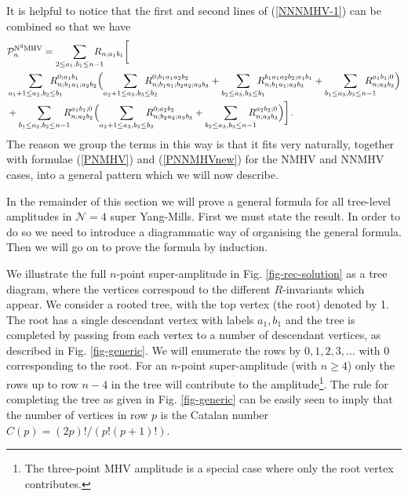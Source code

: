 \documentclass[12pt]{article}
\begin{document}
{It is helpful to notice that the first and second lines of (\ref{NNNMHV-1}) can be combined so that we have
\begin{align}\label{NNNMHV-2}
&\mathcal{P}^{\rm{N}^3\rm{MHV}}_n = \sum_{2\leq a_1,b_1 \leq n-1}
  \!\!\!\!\!\!\!R_{n;a_1b_1}\biggl[\notag \\
&\sum_{a_1+1 \leq a_2,b_2 \leq b_1} \!\!\!\!\!\!\!\!\!
    R_{n;b_1a_1;a_2b_2}^{0;a_1b_1} \Bigl(\sum_{a_2+1 \leq a_3,b_3 \leq b_2}
    \!\!\!\!\!\!\!\!\!R_{n;b_1a_1;b_2a_2;a_3b_3}^{0;b_1a_1a_2b_2} + \sum_{b_2 \leq
      a_3,b_3 \leq b_1} \!\!\!\!\!\!R_{n;b_1a_1;a_3b_3}^{b_1a_1a_2b_2;a_1b_1}+ \sum_{b_1
      \leq a_3,b_3 \leq n-1} \!\!\!\!\!\!\!\! R_{n;a_3b_3}^{a_1b_1;0}
    \Bigr)\notag \\
& +\sum_{b_1\leq a_2,b_2 \leq n-1} \!\!\!\!\!
    R_{n;a_2b_2}^{a_1b_1;0}\Bigl(\sum_{a_2+1\leq a_3,b_3 \leq b_2} \!\!\!\!\!\!
    R_{n;b_2a_2;a_3b_3}^{0;a_2b_2} + \sum_{b_2 \leq a_3,b_3 \leq n-1}
    \!\!\!\!\!\!R_{n;a_3b_3}^{a_2b_2;0}\Bigr)
\biggr] \,.
\end{align}
The reason we group the terms in this way is that it fits very naturally, together with formulae (\ref{PNMHV}) and (\ref{PNNMHVnew}) for the NMHV and NNMHV cases, into a general pattern which we will now describe.

In the remainder of this section we will prove a general formula for all tree-level amplitudes in $\mathcal{N}=4$ super Yang-Mills. First we must state the result. In order to do so we need to introduce a diagrammatic way of organising the general formula. Then we will go on to prove the formula by induction.

We illustrate the full
$n$-point super-amplitude in Fig. \ref{fig-rec-solution} as a tree diagram, where the vertices correspond to the different $R$-invariants which appear. We consider
a rooted tree, with the top vertex (the root) denoted by 1. The root
has a single descendant vertex with labels $a_1,b_1$ and
the tree is completed by passing from each vertex to a number of
descendant vertices, as described in Fig. \ref{fig-generic}. We will enumerate the rows by
$0,1,2,3,\ldots$ with 0
corresponding to the root.
For an
$n$-point super-amplitude (with $n\geq 4$) only the rows up to row $n-4$ in the
tree will contribute to the amplitude\footnote{The three-point MHV amplitude is a special case where
  only the root vertex contributes.}.
The rule for completing the tree as given
in Fig. \ref{fig-generic} can be easily seen to imply that the number
of vertices in row $p$ is the Catalan number $C(p) = (2p)! / (p!
(p+1)!)$.

}
\end{document}
